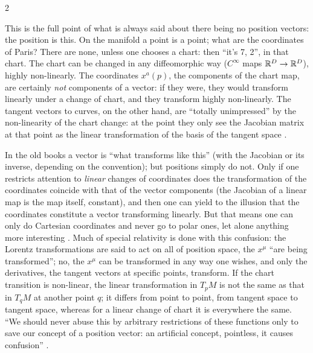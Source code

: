 \begin{paracol}{2}
\begin{intuition}\label{int:tv-position}
This is the full point of what is always said about there being no position vectors: the position is this. On the manifold a point is a point; what are the coordinates of Paris? There are none, unless one chooses a chart: then ``it's 7, 2'', in that chart. The chart can be changed in any diffeomorphic way ($C^\infty$ maps
$\mathbb{R}^D\to\mathbb{R}^D$), highly non-linearly. The coordinates $x^a(p)$, the components of the chart map, are certainly \emph{not} components of a vector: if they were, they would transform linearly under a change of chart, and they transform highly non-linearly. The tangent vectors to curves, on the other hand, are ``totally unimpressed'' by the non-linearity of the chart
change: at the point they only see the Jacobian matrix at that point as the linear transformation of the basis of the tangent space     .
\end{intuition}
In the old books a vector is ``what transforms like this'' (with the Jacobian or its inverse, depending on the convention); but positions simply do not. Only if one restricts attention to \emph{linear} changes of coordinates does the transformation of the coordinates coincide with that of the vector components (the Jacobian of a linear map is the map itself, constant),
and then one can yield to the illusion that the coordinates constitute a vector transforming linearly. But that means one can only do Cartesian coordinates and never go to polar ones, let alone anything more interesting    .
Much of special relativity is done with this confusion: the Lorentz transformations are said to act on all of position space, the $x^\mu$ ``are being transformed''; no, the $x^\mu$ can be transformed in any way one wishes, and only the derivatives, the tangent vectors at specific points, transform. If the chart transition is non-linear, the linear transformation in $T_pM$ is
not the same as that in $T_qM$ at another point $q$; it differs from point to point, from tangent space to tangent space, whereas for a linear change of chart it is everywhere the same. ``We should never abuse this by arbitrary restrictions of these functions only to save our concept of a position vector: an artificial concept, pointless, it causes confusion''
    .


\end{paracol}
